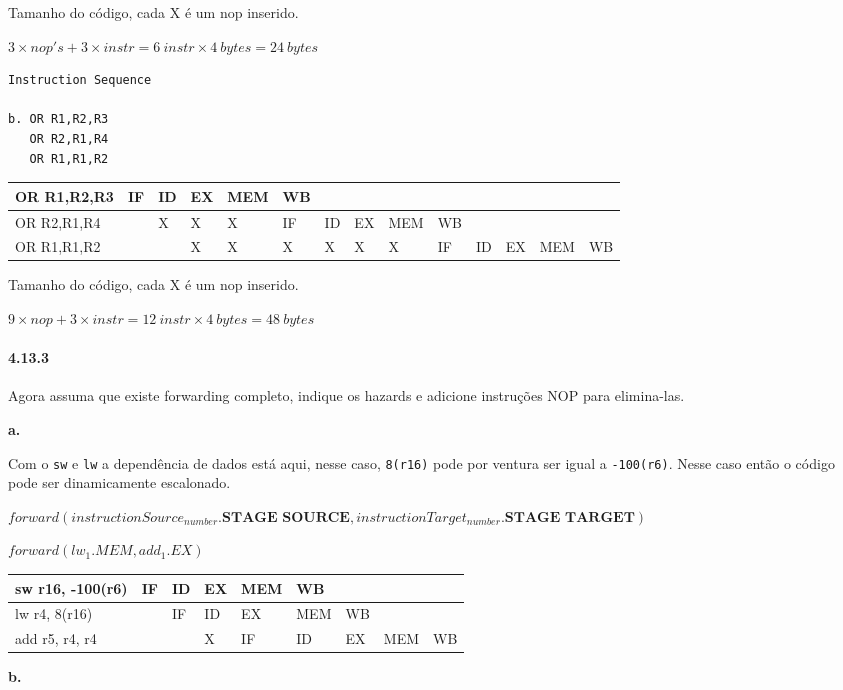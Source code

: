 \documentclass{article}
\begin{document}
Tamanho do código, cada X é um nop inserido.

$3 \times nop's + 3 \times instr = 6\ instr \times 4\ bytes = 24\ bytes$

\begin{verbatim}
Instruction Sequence

b. OR R1,R2,R3
   OR R2,R1,R4
   OR R1,R1,R2
\end{verbatim}

\begin{tabular}{|l|l|l|l|l|l|l|l|l|l|l|l|l|l|}
  \hline OR R1,R2,R3 & IF& ID& EX& MEM&  WB&   &   &    &    &   &   &    &   \\
  \hline OR R2,R1,R4 &   &  X&  X&   X&  IF& ID& EX& MEM&  WB&   &   &    &   \\
  \hline OR R1,R1,R2 &   &   &  X&   X&   X&  X&  X&   X&  IF& ID& EX& MEM& WB\\
  \hline
\end{tabular}

Tamanho do código, cada X é um nop inserido.

$9 \times nop + 3 \times instr = 12\ instr \times 4\ bytes = 48\ bytes$

\clearpage
\paragraph{4.13.3} Agora assuma que existe forwarding completo, indique os
hazards e adicione instruções NOP para elimina-las.

\textbf{a.}

Com o \verb|sw| e \verb|lw| a dependência de dados está aqui, nesse caso, \verb|8(r16)| pode 
por ventura ser igual a \verb|-100(r6)|. Nesse caso então o código pode ser dinamicamente 
escalonado.

$forward(instructionSource_{number}.\textbf{STAGE SOURCE}, 
instructionTarget_{number}.\textbf{STAGE TARGET})$

$forward(lw_{1}.MEM, add_{1}.EX)$

\begin{tabular}{|l|l|l|l|l|l|l|l|l|}
\hline sw r16, -100(r6) & IF& ID& EX& MEM&  WB&   &    &   \\
\hline lw r4, 8(r16)    &   & IF& ID&  EX& MEM& WB&    &   \\
\hline add r5, r4, r4   &   &   &  X&  IF&  ID& EX& MEM& WB\\
\hline
\end{tabular}

\textbf{b.}
\end{document}
